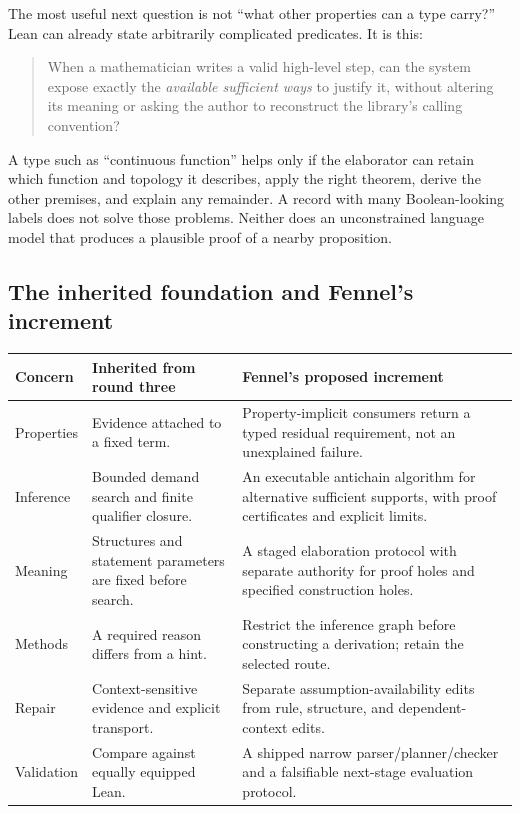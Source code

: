 \documentclass[11pt,a4paper]{article}
\theoremstyle{definition}
\theoremstyle{remark}
\begin{document}
The most useful next question is not ``what other properties can a type carry?''
Lean can already state arbitrarily complicated predicates. It is this:
\begin{quote}
When a mathematician writes a valid high-level step, can the system expose
exactly the \emph{available sufficient ways} to justify it, without altering
its meaning or asking the author to reconstruct the library's calling convention?
\end{quote}

A type such as ``continuous function'' helps only if the elaborator can retain
which function and topology it describes, apply the right theorem, derive the
other premises, and explain any remainder. A record with many Boolean-looking
labels does not solve those problems. Neither does an unconstrained language
model that produces a plausible proof of a nearby proposition.

\subsection{The inherited foundation and Fennel's increment}
\begin{center}\small
\begin{tabularx}{\textwidth}{@{}L{.27\textwidth}YY@{}}
\toprule
Concern & Inherited from round three & Fennel's proposed increment\\
\midrule
Properties & Evidence attached to a fixed term. & Property-implicit consumers return a typed residual requirement, not an unexplained failure.\\
Inference & Bounded demand search and finite qualifier closure. & An executable antichain algorithm for alternative sufficient supports, with proof certificates and explicit limits.\\
Meaning & Structures and statement parameters are fixed before search. & A staged elaboration protocol with separate authority for proof holes and specified construction holes.\\
Methods & A required reason differs from a hint. & Restrict the inference graph before constructing a derivation; retain the selected route.\\
Repair & Context-sensitive evidence and explicit transport. & Separate assumption-availability edits from rule, structure, and dependent-context edits.\\
Validation & Compare against equally equipped Lean. & A shipped narrow parser/planner/checker and a falsifiable next-stage evaluation protocol.\\
\bottomrule
\end{tabularx}
\end{center}
\end{document}
